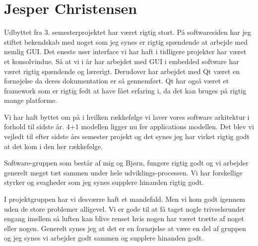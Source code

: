 \section{Jesper Christensen}
Udbyttet fra 3. semesterprojektet har været rigtig stort. På softwaresiden har jeg stiftet bekendskab med noget som jeg synes er rigtig spændende at arbejde med nemlig GUI. Det eneste user interface vi har haft i tidligere projekter har været et konsolvindue. Så at vi i år har arbejdet med GUI i embedded software har været rigtig spændende og lærerigt. Derudover har arbejdet med Qt været en fornøjelse da deres dokumentation er så gennemført. Qt har også været et framework som er rigtig fedt at have fået erfaring i, da det kan bruges på rigtig mange platforme.

Vi har haft byttet om på i hvilken rækkefølge vi laver vores software arkitektur i forhold til sidste år. 4+1 modellen ligger nu før applications modellen. Det blev vi vejledt til efter sidste års semester projekt og det synes jeg har virket rigtig godt at det kom i den her rækkefølge.

Software-gruppen som består af mig og Bjørn, fungere rigtig godt og vi arbejder generelt meget tæt sammen under hele udviklings-processen. Vi har forskellige styrker og svagheder som jeg synes supplere hinanden rigtig godt.

I projektgruppen har vi desværre haft et mandefald. Men vi kom godt igennem uden de store problemer alligevel. Vi er gode til at få taget nogle trivselsrunder engang imellem så luften kan blive renset hvis nogen har været trætte af noget eller nogen. Generelt synes jeg at det er en fornøjelse at være en del af gruppen og jeg synes vi arbejder godt sammen og supplere hinanden godt.